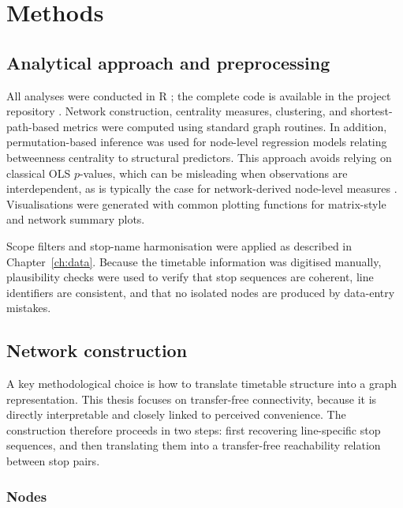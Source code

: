 \documentclass[12pt,a4paper,oneside]{report}
\begin{document}
\chapter{Methods}\label{ch:methods}

\section{Analytical approach and preprocessing}\label{sec:approach}

All analyses were conducted in R \citep{rcore2025}; the complete code is available in the project repository \citep{bachinger2026}.
Network construction, centrality measures, clustering, and shortest-path-based metrics were computed using standard graph routines.
In addition, permutation-based inference was used for node-level regression models relating betweenness centrality to structural predictors.
This approach avoids relying on classical OLS $p$-values, which can be misleading when observations are interdependent, as is typically the case for network-derived node-level measures \citep{butts2008}.
Visualisations were generated with common plotting functions for matrix-style and network summary plots.

Scope filters and stop-name harmonisation were applied as described in Chapter~\ref{ch:data}.
Because the timetable information was digitised manually, plausibility checks were used to verify that stop sequences are coherent, line identifiers are consistent, and that no isolated nodes are produced by data-entry mistakes.

\section{Network construction}\label{sec:construction}

A key methodological choice is how to translate timetable structure into a graph representation.
This thesis focuses on transfer-free connectivity, because it is directly interpretable and closely linked to perceived convenience.
The construction therefore proceeds in two steps: first recovering line-specific stop sequences, and then translating them into a transfer-free reachability relation between stop pairs.

\subsection{Nodes}\label{sec:nodes}
\end{document}
